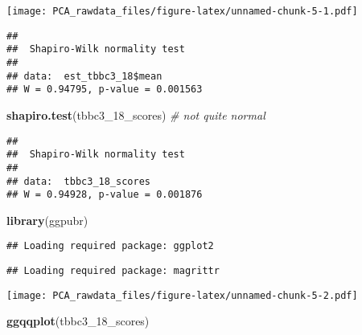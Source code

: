 \documentclass[]{article}
\newenvironment{Shaded}{\begin{snugshade}}{\end{snugshade}}
\newcommand{\CommentTok}[1]{\textcolor[rgb]{0.56,0.35,0.01}{\textit{#1}}}
\newcommand{\DecValTok}[1]{\textcolor[rgb]{0.00,0.00,0.81}{#1}}
\newcommand{\KeywordTok}[1]{\textcolor[rgb]{0.13,0.29,0.53}{\textbf{#1}}}
\newcommand{\NormalTok}[1]{#1}
\newcommand{\OperatorTok}[1]{\textcolor[rgb]{0.81,0.36,0.00}{\textbf{#1}}}
\begin{document}
\texttt{[image: PCA\_rawdata\_files/figure-latex/unnamed-chunk-5-1.pdf]}

\begin{Shaded}
\end{Shaded}

\begin{verbatim}
## 
##  Shapiro-Wilk normality test
## 
## data:  est_tbbc3_18$mean
## W = 0.94795, p-value = 0.001563
\end{verbatim}

\begin{Shaded}
\begin{Highlighting}[]
\KeywordTok{shapiro.test}\NormalTok{(tbbc3_}\DecValTok{18}\NormalTok{_scores) }\CommentTok{# not quite normal}
\end{Highlighting}
\end{Shaded}

\begin{verbatim}
## 
##  Shapiro-Wilk normality test
## 
## data:  tbbc3_18_scores
## W = 0.94928, p-value = 0.001876
\end{verbatim}

\begin{Shaded}
\begin{Highlighting}[]
\KeywordTok{library}\NormalTok{(ggpubr)}
\end{Highlighting}
\end{Shaded}

\begin{verbatim}
## Loading required package: ggplot2
\end{verbatim}

\begin{verbatim}
## Loading required package: magrittr
\end{verbatim}

\texttt{[image: PCA\_rawdata\_files/figure-latex/unnamed-chunk-5-2.pdf]}

\begin{Shaded}
\begin{Highlighting}[]
\KeywordTok{ggqqplot}\NormalTok{(tbbc3_}\DecValTok{18}\NormalTok{_scores)}
\end{Highlighting}
\end{Shaded}
\end{document}
